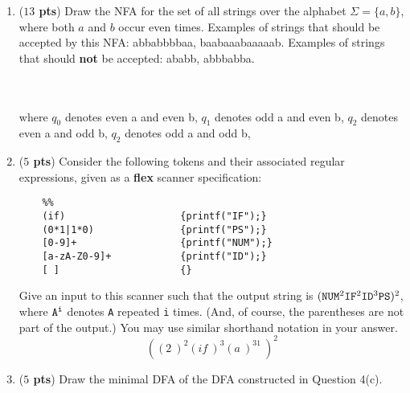\documentclass[10pt]{article}
\newcommand {\pts}[1]{({\bf #1 pts})}
\begin{document}
\begin{enumerate}
   \newpage
  \item \pts{$13$} Draw the NFA for the set of all strings over the alphabet $\Sigma = \{a,b\}$, where both $a$ and $b$ occur even times.
Examples of strings that should be accepted by this NFA: abbabbbbaa, baabaaabaaaaab.
Examples of strings that should \textbf{not} be accepted: ababb, abbbabba.
    \\
    \\
    \\
    where $q_0$ denotes even a and even b,
          $q_1$ denotes odd a and even b,
          $q_2$ denotes even a and odd b,
          $q_2$ denotes odd a and odd b,
  \newpage
   \item \pts{$5$} Consider the following tokens and their associated regular expressions, given as a \textbf{flex} scanner specification:

  \begin{lstlisting}
    %%
    (if)                    {printf("IF");}
    (0*1|1*0)               {printf("PS");}
    [0-9]+                  {printf("NUM");}
    [a-zA-Z0-9]+            {printf("ID");}
    [ ]                     {}
  \end{lstlisting}

  Give an input to this scanner such that the output string is $\tt (NUM^{\rm 2} IF^{\rm 2} ID^{\rm 3} PS)^{\rm 2}$, where $\tt A^i$ denotes {\tt A} repeated {\tt i} times.   (And, of course, the parentheses are not part of the output.)  You may use similar shorthand notation in your answer.
  \[
      ((2\ )^2(if\ )^3(a\ )^31\ )^2
  \]

  \newpage
  \item \pts{$5$} Draw the minimal DFA of the DFA constructed in Question 4(c).
   \\
    \\
\end{enumerate}
\end{document}
